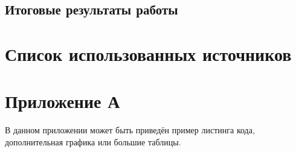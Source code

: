 \documentclass[a4paper,14pt]{extarticle}
\begin{document}
\subsection{Итоговые результаты работы}

\section*{Список использованных источников}



\newpage
\section*{Приложение А}
В данном приложении может быть приведён пример листинга кода, дополнительная графика или большие таблицы.
\end{document}
